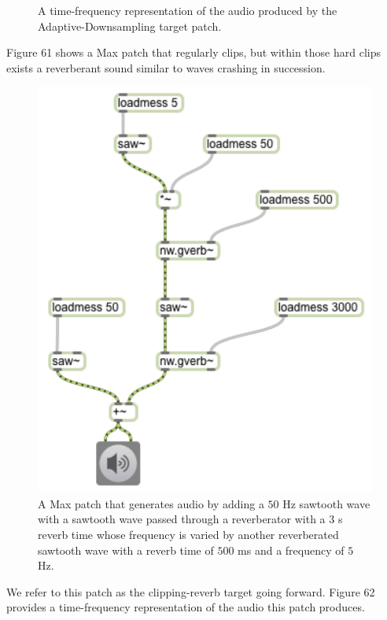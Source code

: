\documentclass[12pt]{report} 	%
\numberwithin{figure}{chapter}
\numberwithin{table}{chapter}
\numberwithin{equation}{chapter}
\begin{document}
\begin{flushleft}
\begin{figure}[h!]
\begin{center}
\caption[Adaptive downsampling time-frequency representation]{A time-frequency representation of the audio produced by the Adaptive-Downsampling target patch.}
\end{center}
\end{figure}

Figure 61 shows a Max patch that regularly clips, but within those hard clips exists a reverberant sound similar to waves crashing in succession. 
\begin{figure}[h!]
\begin{center}
\includegraphics[scale=0.8]{ClippingReverbSaw}
\caption[Clipping reverb sawtooth Max patch]{A Max patch that generates audio by adding a $50$ Hz sawtooth wave with a sawtooth wave passed through a reverberator with a $3$ s reverb time whose frequency is varied by another reverberated sawtooth wave with a reverb time of $500$ ms and a frequency of $5$ Hz.}
\end{center}
\end{figure}
We refer to this patch as the clipping-reverb target going forward. Figure 62 provides a time-frequency representation of the audio this patch produces.

\end{flushleft}
\end{document}
